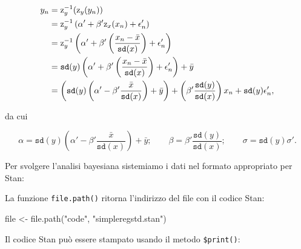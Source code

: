 \documentclass[
  11pt,
]{krantz}
\makeatletter
\newenvironment{Shaded}{\begin{snugshade}}{\end{snugshade}}
\newcommand{\AttributeTok}[1]{\textcolor[rgb]{0.61,0.61,0.61}{#1}}
\newcommand{\FunctionTok}[1]{\textcolor[rgb]{0,0,0}{#1}}
\newcommand{\NormalTok}[1]{#1}
\newcommand{\OtherTok}[1]{\textcolor[rgb]{0.37,0.37,0.37}{#1}}
\newcommand{\SpecialCharTok}[1]{\textcolor[rgb]{0,0,0}{#1}}
\newcommand{\StringTok}[1]{\textcolor[rgb]{0.5,0.5,0.5}{#1}}
\newenvironment{kframe}{%
\medskip{}
\setlength{\fboxsep}{.8em}
 \def\at@end@of@kframe{}%
 \ifinner\ifhmode%
  \def\at@end@of@kframe{\end{minipage}}%
  \begin{minipage}{\columnwidth}%
 \fi\fi%
 \def\FrameCommand##1{\hskip\@totalleftmargin \hskip-\fboxsep
 \colorbox{shadecolor}{##1}\hskip-\fboxsep
     \hskip-\linewidth \hskip-\@totalleftmargin \hskip\columnwidth}%
 \MakeFramed {\advance\hsize-\width
   \@totalleftmargin\z@ \linewidth\hsize
   \@setminipage}}%
 {\par\unskip\endMakeFramed%
 \at@end@of@kframe}
\renewenvironment{Shaded}{\begin{kframe}}{\end{kframe}}
\theoremstyle{definition}
\theoremstyle{definition}
\theoremstyle{definition}
\theoremstyle{definition}
\theoremstyle{remark}
\makeatother
\begin{document}
\begin{align}
y_n &= \textrm{z}_y^{-1}(\textrm{z}_y(y_n)) \notag\\
    &= \textrm{z}_y^{-1}
\left( \alpha' + \beta' \textrm{z}_x(x_n) + \epsilon_n' \right) \notag\\
    &= \textrm{z}_y^{-1}
\left( \alpha' + \beta' \left( \frac{x_n - \bar{x}}{\texttt{sd}(x)} \right) + \epsilon_n' \right) \notag\\
    &= \texttt{sd}(y)
\left( \alpha' + \beta' \left( \frac{x_n - \bar{x}}{\texttt{sd}(x)} \right) + \epsilon_n' \right) + \bar{y} \notag\\
    &=
\left( \texttt{sd}(y) \left( \alpha' - \beta' \frac{\bar{x}}{\texttt{sd}(x)} \right) + \bar{y} \right)
+ \left( \beta' \frac{\texttt{sd}(y)}{\texttt{sd}(x)} \right) x_n
+ \texttt{sd}(y) \epsilon'_n,
\end{align}

da cui

\[
\alpha
=
\texttt{sd}(y)
      \left(
          \alpha'
          - \beta' \frac{\bar{x}}{\texttt{sd}(x)}
      \right)
  + \bar{y};
\qquad
\beta = \beta' \frac{\texttt{sd}(y)}{\texttt{sd}(x)};
\qquad
\sigma = \texttt{sd}(y) \sigma'.
\]

Per svolgere l'analisi bayesiana sistemiamo i dati nel formato appropriato per Stan:

\begin{Shaded}
\end{Shaded}

La funzione \texttt{file.path()} ritorna l'indirizzo del file con il codice Stan:

\begin{Shaded}
\begin{Highlighting}[]
\NormalTok{file }\OtherTok{\textless{}{-}} \FunctionTok{file.path}\NormalTok{(}\StringTok{"code"}\NormalTok{, }\StringTok{"simpleregstd.stan"}\NormalTok{)}
\end{Highlighting}
\end{Shaded}

Il codice Stan può essere stampato usando il metodo \texttt{\$print()}:
\end{document}
